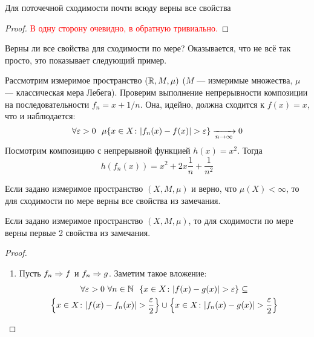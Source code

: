 \begin{theorem}
	Для поточечной сходимости почти всюду верны все свойства
\end{theorem}

\begin{proof}
	\textcolor{red}{В одну сторону очевидно, в обратную тривиально.}
\end{proof}

\begin{note}
	Верны ли все свойства для сходимости по мере? Оказывается, что не всё так просто, это показывает следующий пример.	
\end{note}

\begin{example}
	Рассмотрим измеримое пространство $(\mathbb{R}, M, \mu)$ ($M$ --- измеримые множества, $\mu$ --- классическая мера Лебега). Проверим выполнение непрерывности композиции на последовательности $f_n = x + 1 / n$. Она, идейно, должна сходится к $f(x) = x$, что и наблюдается:
	\[
		\forall \eps > 0\ \ \mu\{x \in X \colon |f_n(x) - f(x)| > \eps\} \xrightarrow[n \to \infty]{} 0
	\]
	Посмотрим композицию с непрерывной функцией $h(x) = x^2$. Тогда
	\[
		h(f_n(x)) = x^2 + 2x\frac{1}{n} + \frac{1}{n^2}
	\]
\end{example}

\begin{theorem}
	Если задано измеримое пространство $(X, M, \mu)$ и верно, что $\mu(X) < \infty$, то для сходимости по мере верны все свойства из замечания.
\end{theorem}

\begin{theorem}
	Если задано измеримое пространство $(X, M, \mu)$, то для сходимости по мере верны первые 2 свойства из замечания.
\end{theorem}

\begin{proof}
	\begin{enumerate}
		\item Пусть $f_n \Rightarrow f$ и $f_n \Rightarrow g$. Заметим такое вложение:
		\begin{multline*}
			\forall \varepsilon > 0\ \forall n \in \mathbb{N}\ \ \{x \in X \colon |f(x) - g(x)| > \varepsilon\} \subseteq
			\\
			\left\{x \in X \colon |f(x) - f_n(x)| > \frac{\varepsilon}{2}\right\} \cup \left\{x \in X \colon |f_n(x) - g(x)| > \frac{\varepsilon}{2}\right\}
		\end{multline*}
	\end{enumerate}
\end{proof}

